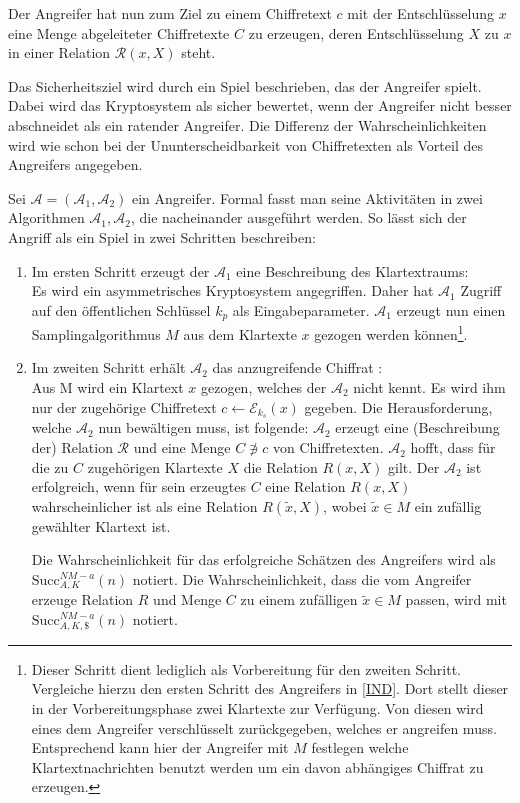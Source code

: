 Der Angreifer hat nun zum Ziel zu einem Chiffretext $c$ mit der Entschlüsselung $x$ eine Menge abgeleiteter Chiffretexte $C$ zu erzeugen, deren Entschlüsselung  $X$ zu $x$ in einer Relation $\mathcal{R}(x,X)$ steht.

Das Sicherheitsziel wird durch ein Spiel beschrieben, das der Angreifer spielt. Dabei wird das Kryptosystem als sicher bewertet, wenn der Angreifer nicht besser abschneidet als ein ratender Angreifer. Die Differenz der Wahrscheinlichkeiten wird wie schon bei der Ununterscheidbarkeit von Chiffretexten als Vorteil des Angreifers angegeben.

Sei $\mathcal{A} = (\mathcal{A}_1,\mathcal{A}_2)$ ein Angreifer. Formal fasst man seine Aktivitäten in zwei Algorithmen $\mathcal{A}_1,\mathcal{A}_2$, die nacheinander ausgeführt werden. So lässt sich der Angriff als ein Spiel in zwei Schritten beschreiben:
	
\begin{enumerate}
		\item Im ersten Schritt erzeugt der $\mathcal{A}_1$ eine Beschreibung des Klartextraums:\\
		Es wird ein asymmetrisches Kryptosystem angegriffen. Daher hat $\mathcal{A}_1$ Zugriff auf den öffentlichen Schlüssel $k_p$ als Eingabeparameter. $\mathcal{A}_1$ erzeugt nun einen Samplingalgorithmus $M$ aus dem Klartexte $x$ gezogen werden können\footnote{Dieser Schritt dient lediglich als Vorbereitung für den zweiten Schritt. Vergleiche hierzu den ersten Schritt des Angreifers in \ref{IND}. Dort stellt dieser in der Vorbereitungsphase zwei Klartexte zur Verfügung. Von diesen wird eines dem Angreifer verschlüsselt zurückgegeben, welches er angreifen muss. Entsprechend kann hier der Angreifer mit $M$ festlegen welche Klartextnachrichten benutzt werden um ein davon abhängiges Chiffrat zu erzeugen.}.
		\item Im zweiten Schritt erhält $\mathcal{A}_2$ das anzugreifende Chiffrat :\\
		Aus M wird ein Klartext $x$ gezogen, welches der  $\mathcal{A}_2$ nicht kennt. Es wird ihm nur der zugehörige Chiffretext $c\leftarrow\mathcal{E}_{k_s}(x)$ gegeben. Die Herausforderung, welche  $\mathcal{A}_2$ nun bewältigen muss, ist folgende:  $\mathcal{A}_2$ erzeugt eine (Beschreibung der) Relation $\mathcal{R}$ und eine Menge $C\notni c$ von Chiffretexten.  $\mathcal{A}_2$ hofft, dass für die zu $C$ zugehörigen Klartexte $X$ die Relation $R(x,X)$ gilt. Der  $\mathcal{A}_2$ ist erfolgreich, wenn für sein erzeugtes $C$ eine Relation $R(x,X)$ wahrscheinlicher ist als eine Relation $R(\tilde{x},X)$, wobei $\tilde{x}\in M$ ein zufällig gewählter Klartext ist.
		
		Die Wahrscheinlichkeit für das erfolgreiche Schätzen des Angreifers wird als $\text{Succ}^{NM-a}_{A,K}(n)$ notiert.  Die Wahrscheinlichkeit, dass die vom Angreifer erzeuge Relation $R$ und Menge $C$ zu einem zufälligen $\tilde{x}\in M$ passen, wird mit $\text{Succ}^{NM-a}_{A,K,\$}(n)$ notiert.
		
		
\end{enumerate}

